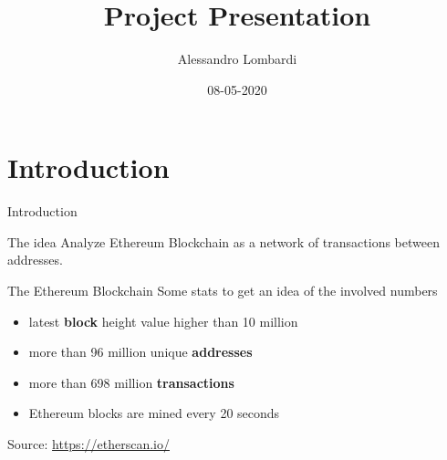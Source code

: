 \documentclass{beamer}
\title[Your Short Title]{Project Presentation}
\author{Alessandro Lombardi}
\institute{Artificial Intelligence - University of Bologna}
\date{08-05-2020}
\begin{document}
\begin{frame}
    \titlepage
\end{frame}


\section{Introduction}\label{sec:introduction}

\begin{frame}{Introduction}

    \begin{block}{The idea}
    Analyze Ethereum Blockchain as a network of transactions between addresses.
    \end{block}

    \vskip 1cm

    \begin{block}{The Ethereum Blockchain}
        Some stats to get an idea of the involved numbers
        \begin{itemize}
            \item latest \textbf{block} height value higher than 10 million
            \item more than 96 million unique \textbf{addresses}
            \item more than 698 million \textbf{transactions}
            \item Ethereum blocks are mined every 20 seconds
        \end{itemize}
        Source: \url{https://etherscan.io/}
    \end{block}

\end{frame}
\end{document}
